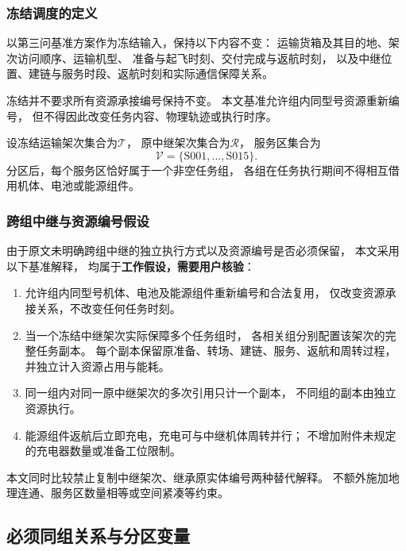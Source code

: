 \documentclass[bwprint]{gmcmthesis}
\begin{document}
\subsubsection{冻结调度的定义}

以第三问基准方案作为冻结输入，保持以下内容不变：
运输货箱及其目的地、架次访问顺序、运输机型、
准备与起飞时刻、交付完成与返航时刻，
以及中继位置、建链与服务时段、返航时刻和实际通信保障关系。

冻结并不要求所有资源承接编号保持不变。
本文基准允许组内同型号资源重新编号，
但不得因此改变任务内容、物理轨迹或执行时序。

设冻结运输架次集合为$\mathcal{T}$，
原中继架次集合为$\mathcal{R}$，
服务区集合为
\begin{equation}
\mathcal{V}=\{\mathrm{S001},\ldots,\mathrm{S015}\}.
\end{equation}
分区后，每个服务区恰好属于一个非空任务组，
各组在任务执行期间不得相互借用机体、电池或能源组件。

\subsubsection{跨组中继与资源编号假设}

由于原文未明确跨组中继的独立执行方式以及资源编号是否必须保留，
本文采用以下基准解释，
均属于\textbf{工作假设，需要用户核验}：

\begin{enumerate}
    \item 允许组内同型号机体、电池及能源组件重新编号和合法复用，
    仅改变资源承接关系，不改变任何任务时刻。

    \item 当一个冻结中继架次实际保障多个任务组时，
    各相关组分别配置该架次的完整任务副本。
    每个副本保留原准备、转场、建链、服务、返航和周转过程，
    并独立计入资源占用与能耗。

    \item 同一组内对同一原中继架次的多次引用只计一个副本，
    不同组的副本由独立资源执行。

    \item 能源组件返航后立即充电，充电可与中继机体周转并行；
    不增加附件未规定的充电器数量或准备工位限制。
\end{enumerate}

本文同时比较禁止复制中继架次、继承原实体编号两种替代解释。
不额外施加地理连通、服务区数量相等或空间紧凑等约束。

\subsection{必须同组关系与分区变量}
\end{document}
